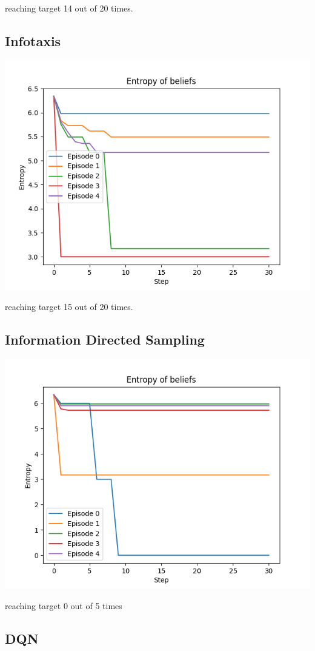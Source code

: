 \documentclass[12pt,a4paper]{article}
\begin{document}
reaching target 14 out of 20 times.

\subsection{Infotaxis}
\begin{center}
  \includegraphics[scale=0.7]{../src/plots/Infotaxisentropy_0out5.png}
\end{center}

reaching target 15 out of 20 times.

\subsection{Information Directed Sampling}
\cite{russo2017learningoptimizeinformationdirectedsampling}

\begin{center}
  \includegraphics[scale=0.7]{../src/plots/IDSentropy_0out5.png}
\end{center}

reaching target 0 out of 5 times


\subsection{DQN}




\newpage


\end{document}
